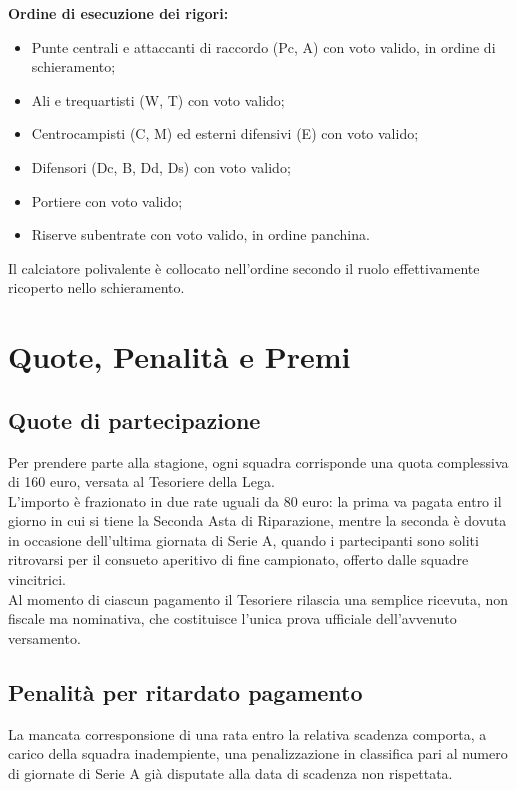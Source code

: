 \textbf{Ordine di esecuzione dei rigori:}
\begin{itemize}
\item Punte centrali e attaccanti di raccordo (Pc, A) con voto valido, in ordine di schieramento;
\item Ali e trequartisti (W, T) con voto valido;
\item Centrocampisti (C, M) ed esterni difensivi (E) con voto valido;
\item Difensori (Dc, B, Dd, Ds) con voto valido;
\item Portiere con voto valido;
\item Riserve subentrate con voto valido, in ordine panchina.
\end{itemize}

Il calciatore polivalente è collocato nell'ordine secondo il ruolo effettivamente ricoperto nello schieramento.


\chapter{Quote, Penalità e Premi}
\label{cap:quote-penalita-premi}

\section{Quote di partecipazione}
\label{art:10.1}

Per prendere parte alla stagione, ogni squadra corrisponde una quota complessiva di 160 euro, versata al Tesoriere della Lega.\\
L'importo è frazionato in due rate uguali da 80 euro: la prima va pagata entro il giorno in cui si tiene la Seconda Asta di Riparazione, mentre la seconda è dovuta in occasione dell'ultima giornata di Serie A, quando i partecipanti sono soliti ritrovarsi per il consueto aperitivo di fine campionato, offerto dalle squadre vincitrici.\\
Al momento di ciascun pagamento il Tesoriere rilascia una semplice ricevuta, non fiscale ma nominativa, che costituisce l'unica prova ufficiale dell'avvenuto versamento.

\section{Penalità per ritardato pagamento}
\label{art:10.2}

La mancata corresponsione di una rata entro la relativa scadenza comporta, a carico della squadra inadempiente, una penalizzazione in classifica pari al numero di giornate di Serie A già disputate alla data di scadenza non rispettata.

